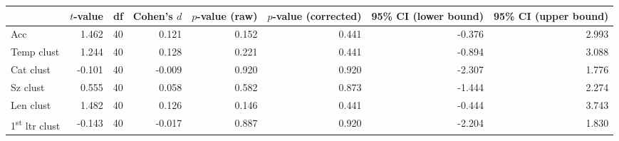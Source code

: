 \begin{tabular}{lrrrrrrr}
\toprule
 & $t$-value & df & Cohen's $d$ & $p$-value (raw) & $p$-value (corrected) & 95\% CI (lower bound) & 95\% CI (upper bound) \\
\midrule
 Acc & 1.462 & 40 & 0.121 & 0.152 & 0.441 & -0.376 & 2.993 \\
 Temp clust & 1.244 & 40 & 0.128 & 0.221 & 0.441 & -0.894 & 3.088 \\
 Cat clust & -0.101 & 40 & -0.009 & 0.920 & 0.920 & -2.307 & 1.776 \\
 Sz clust & 0.555 & 40 & 0.058 & 0.582 & 0.873 & -1.444 & 2.274 \\
 Len clust & 1.482 & 40 & 0.126 & 0.146 & 0.441 & -0.444 & 3.743 \\
 1\textsuperscript{st} ltr clust & -0.143 & 40 & -0.017 & 0.887 & 0.920 & -2.204 & 1.830 \\
\bottomrule
\end{tabular}